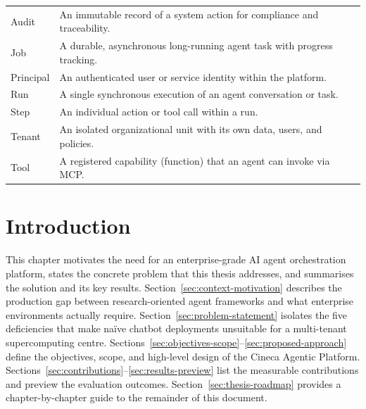 \documentclass[a4paper]{sapthesis}
\begin{document}
\noindent\begin{tabularx}{\textwidth}{@{}l X@{}}
Audit     & An immutable record of a system action for compliance and traceability. \\
Job       & A durable, asynchronous long-running agent task with progress tracking. \\
Principal & An authenticated user or service identity within the platform. \\
Run       & A single synchronous execution of an agent conversation or task. \\
Step      & An individual action or tool call within a run. \\
Tenant    & An isolated organizational unit with its own data, users, and policies. \\
Tool      & A registered capability (function) that an agent can invoke via MCP. \\
\end{tabularx}


\mainmatter


\chapter{Introduction}
\label{ch:introduction}

This chapter motivates the need for an enterprise-grade AI agent orchestration
platform, states the concrete problem that this thesis addresses, and
summarises the solution and its key results.  Section~\ref{sec:context-motivation}
describes the production gap between research-oriented agent frameworks and
what enterprise environments actually require.
Section~\ref{sec:problem-statement} isolates the five deficiencies that make
na\"ive chatbot deployments unsuitable for a multi-tenant supercomputing
centre.  Sections~\ref{sec:objectives-scope}--\ref{sec:proposed-approach}
define the objectives, scope, and high-level design of the Cineca Agentic
Platform.  Sections~\ref{sec:contributions}--\ref{sec:results-preview}
list the measurable contributions and preview the evaluation outcomes.
Section~\ref{sec:thesis-roadmap} provides a chapter-by-chapter guide to the
remainder of this document.
\end{document}
